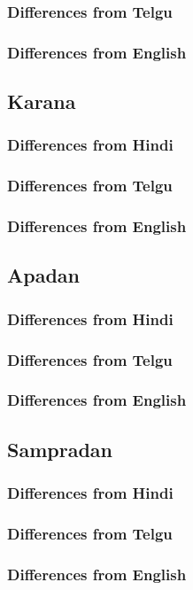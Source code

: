 \documentclass[a4paper,10pt]{article}
\begin{document}
\subsubsection{Differences from Telgu}
\subsubsection{Differences from English}
\subsection{Karana}
\subsubsection{Differences from Hindi}
\subsubsection{Differences from Telgu}
\subsubsection{Differences from English}
\subsection{Apadan}
\subsubsection{Differences from Hindi}
\subsubsection{Differences from Telgu}
\subsubsection{Differences from English}
\subsection{Sampradan}
\subsubsection{Differences from Hindi}
\subsubsection{Differences from Telgu}
\subsubsection{Differences from English}
\end{document}
